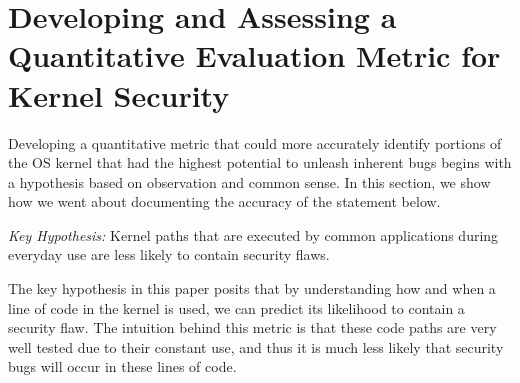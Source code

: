 \section{Developing and Assessing a Quantitative Evaluation Metric for Kernel Security}
\label{sec.metric}
Developing a quantitative metric that could more accurately identify portions of
the OS kernel that had the highest potential to unleash inherent bugs begins with a
hypothesis based on observation and common sense. In this section, we show how we
went about documenting the accuracy of the statement below.

\emph{Key Hypothesis:} Kernel paths that are executed by common applications
during everyday use are less likely to contain security flaws.

The key hypothesis in this paper posits that by understanding how and when
a line of code in the kernel is used, we can predict its likelihood to
contain a security flaw.
The intuition behind this metric is that these code paths are very well tested
due to their constant use, and thus it is much less likely that security bugs
will occur in these lines of code.










